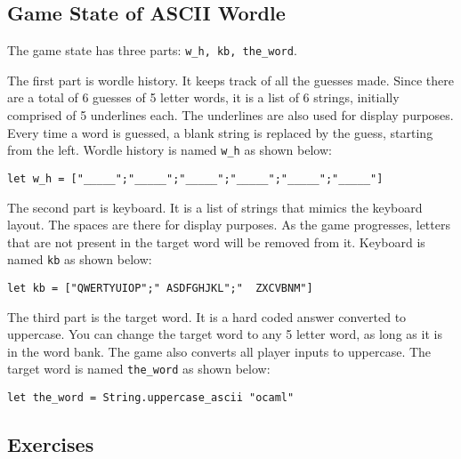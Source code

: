 \documentclass{article}
\newcommand{\code}[1]{\lstinline!#1!}
\begin{document}
\subsection{Game State of ASCII Wordle}

The game state has three parts: \code{w_h, kb, the_word}.

The first part is wordle history. It keeps track of all the guesses made. Since there are a total of 6 guesses of 5 letter words, it is a list of 6 strings, initially comprised of 5 underlines each. The underlines are also used for display purposes. Every time a word is guessed, a blank string is replaced by the guess, starting from the left. Wordle history is named \code{w_h} as shown below:
\begin{lstlisting}
let w_h = ["_____";"_____";"_____";"_____";"_____";"_____"]
\end{lstlisting}
The second part is keyboard. It is a list of strings that mimics the keyboard layout. The spaces are there for display purposes. As the game progresses, letters that are not present in the target word will be removed from it. Keyboard is named \code{kb} as shown below:
\begin{lstlisting}
let kb = ["QWERTYUIOP";" ASDFGHJKL";"  ZXCVBNM"]
\end{lstlisting}
The third part is the target word. It is a hard coded answer converted to uppercase. You can change the target word to any 5 letter word, as long as it is in the word bank. The game also converts all player inputs to uppercase. The target word is named \code{the_word} as shown below:
\begin{lstlisting}
let the_word = String.uppercase_ascii "ocaml"
\end{lstlisting}

\subsection{Exercises}
\end{document}
